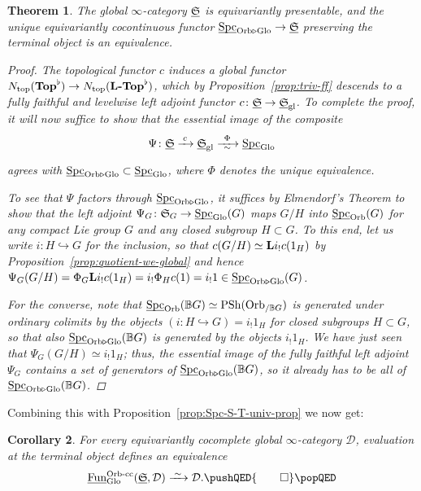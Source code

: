 \documentclass[reqno]{memo-l}
\theoremstyle{mythm}
\newtheorem{thm}{Theorem}[section]
\newtheorem{cor}[thm]{Corollary}
\theoremstyle{definition}
\numberwithin{equation}{section}
\newcommand{\qednow}{\pushQED{\qed}\qedhere\popQED}
\newcommand{\Dd}{{\mathcal{D}}}
\newcommand{\gl}{\textup{gl}}
\DeclareMathOperator{\Spc}{Spc}
\newcommand{\Fun}{{\textup{Fun}}}
\DeclareMathOperator{\PSh}{PSh}
\newcommand{\Ntop}{{N_\textup{top}}}
\newcommand{\cat}[1]{\textbf{\textup{#1}}}
\newcommand{\consto}{\ensuremath{c}}
\newcommand{\dual}{\flat}
\newcommand{\Orb}{{\vphantom{\textup{t}}\smash{\textup{Orb}}}}
\newcommand{\Glo}{\textup{Glo}}
\newcommand{\BGcat}[1]{\mathbb B{#1}}
\newcommand{\ulhelper}[2]{\underline{\setbox0=\hbox{$#1#2$}\dp0=0.4pt \box0\relax}}
\newcommand{\ul}[1]{{\mathpalette\ulhelper{#1}}\hbox{\rule[-2pt]{0pt}{0pt}}}
\newcommand{\iso}{\xrightarrow{\;\smash{\raisebox{-0.25ex}{\ensuremath{\scriptstyle\sim}}}\;}}
\newcommand{\myS}{{{\mathfrak S\kern-.4pt}}}
\begin{document}
\begin{thm}\label{thm:unstable-equiv-main}
    The global $\infty$-category $\ul\myS$ is equivariantly presentable, and the unique equivariantly cocontinuous functor $\ul\Spc_{\Orb\triangleright\Glo}\to\ul\myS$ preserving the terminal object is an equivalence.
    \begin{proof}
        The topological functor $\consto$ induces a global functor $\smash{\Ntop(\cat{Top}^\dual)}\to\smash{\Ntop(\cat{$\cat{L}$-Top}^\dual)}$, which by Proposition~\ref{prop:triv-ff} descends to a fully faithful and levelwise left adjoint functor $\consto\colon\ul\myS\to\ul\myS_\gl$. To complete the proof, it will now suffice to show that the essential image of the composite
        \[
            \Psi\colon\ul\myS\xrightarrow{\;\consto\;}\ul\myS_\gl\xrightarrow[\smash{\raise3.5pt\hbox{$\scriptstyle\sim$}}]{\;\,\Phi\,\;}\ul\Spc_{\Glo}
        \]
        agrees with $\ul\Spc_{\Orb\triangleright\Glo}\subset\ul\Spc_{\Glo}$, where $\Phi$ denotes the unique equivalence.

        To see that $\Psi$ factors through $\ul\Spc_{\Orb\triangleright\Glo}$, it suffices by Elmendorf's Theorem to show that the left adjoint $\Psi_G\colon\myS_G\to\ul\Spc_{\Glo}(G)$ maps $G/H$ into $\ul\Spc_{\Orb}(G)$ for any compact Lie group $G$ and any closed subgroup $H\subset G$. To this end, let us write $i\colon H\hookrightarrow G$ for the inclusion, so that $\consto(G/H)\simeq\cat{L}i_!\consto(1_H)$ by Proposition~\ref{prop:quotient-we-global} and hence $\Psi_G(G/H)=\Phi_G\cat{L}i_!\consto(1_H)=i_!\Phi_H\consto(1)=i_!1\in\ul\Spc_{\Orb\triangleright\Glo}(G)$.

        For the converse, note that $\ul\Spc_{\Orb}(\BGcat{G})\simeq\PSh(\Orb_{/\BGcat{G}})$ is generated under ordinary colimits by the objects $(i\colon H\hookrightarrow G)=i_!1_H$ for closed subgroups $H\subset G$, so that also $\ul\Spc_{\Orb\triangleright\Glo}(\BGcat{G})$ is generated by the objects $i_!1_H$. We have just seen that $\Psi_G(G/H)\simeq i_!1_H$; thus, the essential image of the fully faithful left adjoint $\Psi_G$ contains a set of generators of $\ul\Spc_{\Orb\triangleright\Glo}(\BGcat{G})$, so it already has to be all of $\ul\Spc_{\Orb\triangleright\Glo}(\BGcat{G})$.
    \end{proof}
\end{thm}

Combining this with Proposition~\ref{prop:Spc-S-T-univ-prop} we now get:

\begin{cor}\label{cor:equiv-spaces-universal}
    For every equivariantly cocomplete global $\infty$-category $\Dd$, evaluation at the terminal object defines an equivalence
    \[
        \ul\Fun^{\textup{Orb-cc}}_{\Glo}(\ul\myS,\Dd)\iso\Dd.\qednow
    \]
\end{cor}
\end{document}
